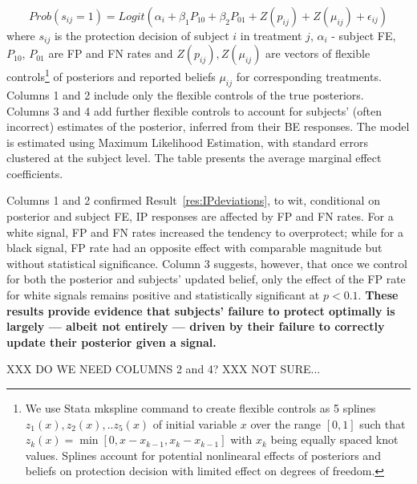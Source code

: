 \documentclass[12pt,a4paper]{article}
\newcommand{\agt}[1]{{\color{OliveGreen}#1}}
\begin{document}
	\[Prob(s_{ij}=1)=Logit(\alpha_i+\beta_1 P_{10}+\beta_2 P_{01}+Z(p_{ij})+Z(\mu_{ij})+\epsilon_{ij}) \]
where $s_{ij}$ is the protection decision of subject $i$ in treatment $j$, $\alpha_i$ - subject FE, $P_{10}$, $P_{01}$ are FP and FN rates and $Z(p_{ij}),Z(\mu_{ij})$ are vectors of flexible controls\footnote{We use Stata mkspline command to create flexible controls as 5 splines $z_1(x),z_2(x),..z_5(x)$ of initial variable $x$ over the range $[0,1]$ such that $z_k(x)=\min[0,x-x_{k-1},x_k-x_{k-1}]$ with $x_k$ being equally spaced knot values. Splines account for potential nonlinearal effects of posteriors and beliefs on protection decision with limited effect on degrees of freedom.} of posteriors and reported beliefs $\mu_{ij}$ for corresponding treatments. Columns 1 and 2 include only the flexible controls of the true posteriors. Columns 3 and 4 add further flexible controls to account for subjects' (often incorrect) estimates of the posterior, inferred from their BE responses. The model is estimated using Maximum Likelihood Estimation, with standard errors clustered at the subject level. The table presents the average marginal effect coefficients.

Columns 1 and 2 confirmed Result~\ref{res:IPdeviations}, to wit, conditional on posterior and subject FE, IP responses are affected by FP and FN rates. For a white signal, FP and FN rates increased the tendency to overprotect; while for a black signal, FP rate had an opposite effect with comparable magnitude but without statistical significance. Column 3 suggests, however, that once we control for both the posterior and subjects' updated belief, only the effect of the FP rate for white signals remains positive and statistically significant at $p<0.1$. \textbf{These results provide evidence that subjects' failure to protect optimally is largely --- albeit not entirely --- driven by their failure to correctly update their posterior given a signal.}

\agt{XXX DO WE NEED COLUMNS 2 and 4? XXX NOT SURE...}
\end{document}

